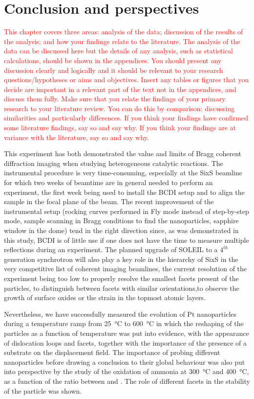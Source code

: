 \section{Conclusion and perspectives}

\textcolor{red}{This chapter covers three areas: analysis of the data; discussion of the results of the analysis; and how your findings relate to the literature. The analysis of the data can be discussed here but the details of any analysis, such as statistical calculations, should be shown in the appendices. You should present any discussion clearly and logically and it should be relevant to your research questions/hypotheses or aims and objectives. Insert any tables or figures that you decide are important in a relevant part of the text not in the appendices, and discuss them fully. Make sure that you relate the findings of your primary research to your literature review. You can do this by comparison: discussing similarities and particularly differences. If you think your findings have confirmed some literature findings, say so and say why. If you think your findings are at variance with the literature, say so and say why.}

This experiment has both demonstrated the value and limits of Bragg coherent diffraction imaging when studying heterogeneous catalytic reactions.
The instrumental procedure is very time-consuming, especially at the SixS beamline for which two weeks of beamtime are in general needed to perform an experiment, the first week being used to install the BCDI setup and to align the sample in the focal plane of the beam.
The recent improvement of the instrumental setup (rocking curves performed in Fly mode instead of step-by-step mode, sample scanning in Bragg conditions to find the nanoparticles, sapphire window in the dome) tend in the right direction since, as was demonstrated in this study, BCDI is of little use if one does not have the time to measure multiple reflections during an experiment.
The planned upgrade of SOLEIL to a $4^{th}$ generation synchrotron will also play a key role in the hierarchy of SixS in the very competitive list of coherent imaging beamlines, the current resolution of the experiment being too low to properly resolve the smallest facets present of the particles, to distinguish between facets with similar orientations,to observe the growth of surface oxides or the strain in the topmost atomic layers.

Nevertheless, we have successfully measured the evolution of Pt nanoparticles during a temperature ramp from \qty{25}{\degreeCelsius} to \qty{600}{\degreeCelsius} in which the reshaping of the particles as a function of temperature was put into evidence, with the appearance of dislocation loops and facets, together with the importance of the presence of a substrate on the displacement field.
The importance of probing different nanoparticles before drawing a conclusion to their global behaviour was also put into perspective by the study of the oxidation of ammonia at \qty{300}{\degreeCelsius} and \qty{400}{\degreeCelsius}, as a function of the ratio between  and \ammonia.
The role of different facets in the stability of the particle was shown.

